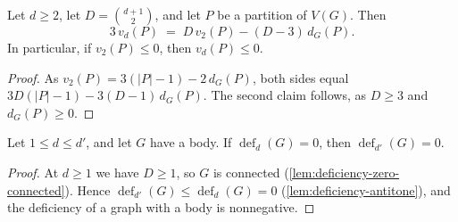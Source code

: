 \begin{lemma}
  \label{lem:deficiency-planar-nonpos}
  \leanok
  Let $d \ge 2$, let $D = \binom{d+1}{2}$, and let $P$ be a partition of
  $V(G)$. Then
  \[
    3\,v_d(P) \;=\; D\,v_2(P) - (D - 3)\,d_G(P).
  \]
  In particular, if $v_2(P) \le 0$, then $v_d(P) \le 0$.
\end{lemma}
\begin{proof}
  \leanok
  As $v_2(P) = 3(|P| - 1) - 2\,d_G(P)$, both sides equal
  $3D(|P| - 1) - 3(D - 1)\,d_G(P)$. The second claim follows, as
  $D \ge 3$ and $d_G(P) \ge 0$.
\end{proof}

\begin{lemma}
  \label{lem:deficiency-rigid-higher}
  \leanok
  Let $1 \le d \le d'$, and let $G$ have a body. If
  $\operatorname{def}_d(G) = 0$, then $\operatorname{def}_{d'}(G) = 0$.
\end{lemma}
\begin{proof}
  \leanok
  At $d \ge 1$ we have $D \ge 1$, so $G$ is connected
  (\cref{lem:deficiency-zero-connected}). Hence
  $\operatorname{def}_{d'}(G) \le \operatorname{def}_d(G) = 0$
  (\cref{lem:deficiency-antitone}), and the deficiency of a graph with a
  body is nonnegative.
\end{proof}

